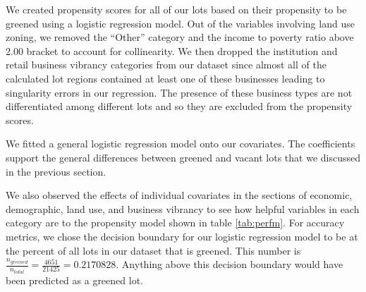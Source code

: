 \documentclass{article}
\begin{document}
We created propensity scores for all of our lots based on their propensity to be greened using a logistic regression model. Out of the variables involving land use zoning, we removed the “Other” category and the income to poverty ratio above 2.00 bracket to account for collinearity. We then dropped the institution and retail business vibrancy categories from our dataset since almost all of the calculated lot regions contained at least one of these businesses leading to singularity errors in our regression. The presence of these business types are not differentiated among different lots and so they are excluded from the propensity scores.

We fitted a general logistic regression model onto our covariates. The coefficients support the general differences between greened and vacant lots that we discussed in the previous section.

We also observed the effects of individual covariates in the sections of economic, demographic, land use, and business vibrancy to see how helpful variables in each category are to the propensity model shown in table \ref{tab:perfm}. For accuracy metrics, we chose the decision boundary for our logistic regression model to be at the percent of all lots in our dataset that is greened. This number is $\frac{n_{greened}}{n_{total}} = \frac{4651}{21425} = 0.2170828$. Anything above this decision boundary would have been predicted as a greened lot.
\end{document}
